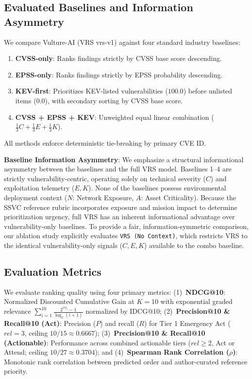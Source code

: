 \documentclass[conference]{IEEEtran}
\begin{document}
\subsection{Evaluated Baselines and Information Asymmetry}
We compare Vulture-AI (VRS vrs-v1) against four standard industry baselines:
\begin{enumerate}
    \item \textbf{CVSS-only}: Ranks findings strictly by CVSS base score descending.
    \item \textbf{EPSS-only}: Ranks findings strictly by EPSS probability descending.
    \item \textbf{KEV-first}: Prioritizes KEV-listed vulnerabilities ($100.0$) before unlisted items ($0.0$), with secondary sorting by CVSS base score.
    \item \textbf{CVSS + EPSS + KEV}: Unweighted equal linear combination ($\frac{1}{3} C + \frac{1}{3} E + \frac{1}{3} K$).
\end{enumerate}
All methods enforce deterministic tie-breaking by primary CVE ID.

\textbf{Baseline Information Asymmetry}: We emphasize a structural informational asymmetry between the baselines and the full VRS model. Baselines 1--4 are strictly vulnerability-centric, operating solely on technical severity ($C$) and exploitation telemetry ($E, K$). None of the baselines possess environmental deployment context ($N$: Network Exposure, $A$: Asset Criticality). Because the SSVC reference rubric incorporates exposure and mission impact to determine prioritization urgency, full VRS has an inherent informational advantage over vulnerability-only baselines. To provide a fair, information-symmetric comparison, our ablation study explicitly evaluates \texttt{VRS (No Context)}, which restricts VRS to the identical vulnerability-only signals ($C, E, K$) available to the combo baseline.

\subsection{Evaluation Metrics}
We evaluate ranking quality using four primary metrics:
(1)~\textbf{NDCG@10}: Normalized Discounted Cumulative Gain at $K=10$ with exponential graded relevance $\sum_{i=1}^{10} \frac{2^{rel_i} - 1}{\log_2(i+1)}$ normalized by IDCG@10;
(2)~\textbf{Precision@10 \& Recall@10 (Act)}: Precision ($P$) and recall ($R$) for Tier 1 Emergency Act ($rel = 3$, ceiling $10/15 \approx 0.6667$);
(3)~\textbf{Precision@10 \& Recall@10 (Actionable)}: Performance across combined actionable tiers ($rel \ge 2$, Act or Attend; ceiling $10/27 \approx 0.3704$); and
(4)~\textbf{Spearman Rank Correlation ($\rho$)}: Monotonic rank correlation between predicted order and author-curated reference priority.
\end{document}
